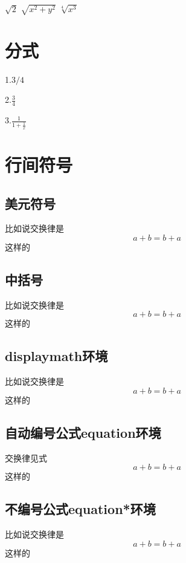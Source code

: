 \documentclass{article}
\begin{document}
    $\sqrt{2}$
    $\sqrt{x^2+y^2}$
    $\sqrt[4]{x^3}$%
    \section{分式}
    1.$3/4$
    
    2.$\frac{3}{4}$%

    3.$\frac{1}{1+ \frac{1}{x}}$
    \section{行间符号}
    \subsection{美元符号}
    比如说交换律是$$a+b=b+a$$这样的
    \subsection{中括号}
    比如说交换律是\[a+b=b+a\]这样的
    \subsection{displaymath环境}
    比如说交换律是
    \begin{displaymath}
    a+b=b+a
    \end{displaymath}
    这样的
    \subsection{自动编号公式equation环境}
    交换律见式 
    \begin{equation}
        a+b=b+a
    \end{equation}
    这样的
    
    \subsection{不编号公式equation*环境}
    比如说交换律是
    \begin{equation*}
    a+b=b+a
    \end{equation*}
    这样的
\end{document}
